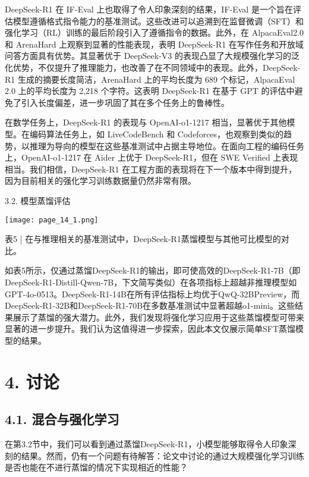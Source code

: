 \documentclass[12pt,a4paper]{report} %
\begin{document}
DeepSeek-R1 在 IF-Eval 上也取得了令人印象深刻的结果，IF-Eval 是一个旨在评估模型遵循格式指令能力的基准测试。这些改进可以追溯到在监督微调（SFT）和强化学习（RL）训练的最后阶段引入了遵循指令的数据。此外，在 AlpacaEval2.0 和 ArenaHard 上观察到显著的性能表现，表明 DeepSeek-R1 在写作任务和开放域问答方面具有优势。其显著优于 DeepSeek-V3 的表现凸显了大规模强化学习的泛化优势，不仅提升了推理能力，也改善了在不同领域中的表现。此外，DeepSeek-R1 生成的摘要长度简洁，ArenaHard 上的平均长度为 689 个标记，AlpacaEval 2.0 上的平均长度为 2,218 个字符。这表明
DeepSeek-R1 在基于 GPT 的评估中避免了引入长度偏差，进一步巩固了其在多个任务上的鲁棒性。


在数学任务上，DeepSeek-R1 的表现与 OpenAI-o1-1217 相当，显著优于其他模型。在编码算法任务上，如 LiveCodeBench 和 Codeforces，也观察到类似的趋势，以推理为导向的模型在这些基准测试中占据主导地位。在面向工程的编码任务上，OpenAI-o1-1217 在 Aider 上优于 DeepSeek-R1，但在 SWE Verified 上表现相当。我们相信，DeepSeek-R1 在工程方面的表现将在下一个版本中得到提升，因为目前相关的强化学习训练数据量仍然非常有限。


3.2. 模型蒸馏评估


\begin{center}
\texttt{[image: page\_14\_1.png]}
\end{center}
\begin{center}
表5 | 在与推理相关的基准测试中，DeepSeek-R1蒸馏模型与其他可比模型的对比。
\end{center}






如表5所示，仅通过蒸馏DeepSeek-R1的输出，即可使高效的DeepSeek-R1-7B（即DeepSeek-R1-Distill-Qwen-7B，下文简写类似）在各项指标上超越非推理模型如GPT-4o-0513。DeepSeek-R1-14B在所有评估指标上均优于QwQ-32BPreview，而DeepSeek-R1-32B和DeepSeek-R1-70B在多数基准测试中显著超越o1-mini。这些结果展示了蒸馏的强大潜力。此外，我们发现将强化学习应用于这些蒸馏模型可带来显著的进一步提升。我们认为这值得进一步探索，因此本文仅展示简单SFT蒸馏模型的结果。


\section*{4. 讨论}


\subsection*{4.1. 混合与强化学习}


在第3.2节中，我们可以看到通过蒸馏DeepSeek-R1，小模型能够取得令人印象深刻的结果。然而，仍有一个问题有待解答：论文中讨论的通过大规模强化学习训练是否也能在不进行蒸馏的情况下实现相近的性能？
\end{document}
